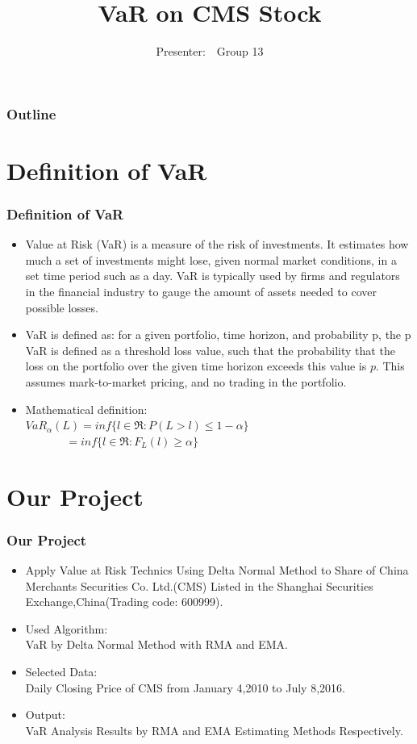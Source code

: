 \documentclass[12pt]{beamer}
\title{VaR on CMS Stock}
\author[$Group 13$]{Presenter:\ \  Group 13 }
\institute[]{
	\textsl{By: Huang Junfeng, Wu Peikun, Sun Liang, Cao Chunyu}
}
\date[July 10$\ {th}, 2016$]{}
\begin{document}
	
\begin{frame}
	\titlepage
\end{frame}


\begin{frame}
	\frametitle{Outline}
	\tableofcontents
\end{frame}

\section{Definition of VaR}
\begin{frame}
	\frametitle{Definition of VaR}
	\begin{itemize}
		\item Value at Risk (VaR) is a measure of the risk of investments. It estimates how much a set of investments might lose, given normal market conditions, in a set time period such as a day. VaR is typically used by firms and regulators in the financial industry to gauge the amount of assets needed to cover possible losses.
		\item VaR is defined as: for a given portfolio, time horizon, and probability p, the p VaR is defined as a threshold loss value, such that the probability that the loss on the portfolio over the given time horizon exceeds this value is $p$. This assumes mark-to-market pricing, and no trading in the portfolio.
		
		\item Mathematical definition:
\\$VaR_\alpha(L)$$=inf\{l\in\Re:P(L>l)\leqslant1-\alpha\}$\\$\ \ \ \ \ \ \ \ \ \ \ \ \ \ \ \ =inf\{l\in\Re:F_L(l)\geqslant\alpha\}$

	\end{itemize}
\end{frame}


\section{Our Project}
\begin{frame}
	\frametitle{Our Project}
	\begin{itemize}
		\item Apply Value at Risk Technics Using Delta Normal Method to  Share of China Merchants Securities Co. Ltd.(CMS) Listed in the Shanghai Securities Exchange,China(Trading code: 600999).
        \item Used Algorithm:   \\VaR by Delta Normal Method with RMA and EMA.
        \item Selected Data: \\Daily Closing Price of CMS from January 4,2010 to July 8,2016.
\item Output:   \\ VaR Analysis Results by RMA and EMA Estimating Methods Respectively.
	\end{itemize}
\end{frame}
\end{document}
